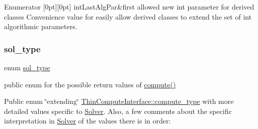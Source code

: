 \begin{DoxyEnumFields}{Enumerator}
[0pt][0pt]{}\mbox{\label{class_s_m_spp__di__unipi__it_1_1_solver_ac943b88bbfe5d261459af51eadcb5bb6a02f1c0ba6384e528e49a4076bfc21537}} 
int\+Last\+Alg\+Par&first allowed new int parameter for derived classes Convenience value for easily allow derived classes to extend the set of int algorithmic parameters. \\
\hline

\end{DoxyEnumFields}
\mbox{\label{class_s_m_spp__di__unipi__it_1_1_solver_a2e0367580e249e8e6018c919bee5481d}} 
\subsubsection{\texorpdfstring{sol\+\_\+type}{sol\_type}}
{\footnotesize\ttfamily enum \mbox{\hyperlink{class_s_m_spp__di__unipi__it_1_1_solver_a2e0367580e249e8e6018c919bee5481d}{sol\+\_\+type}}}



public enum for the possible return values of \mbox{\hyperlink{class_s_m_spp__di__unipi__it_1_1_solver_a504d4e3e174c7a518cc66156a8a45ce5}{compute()}} 

Public enum \char`\"{}extending\char`\"{} \mbox{\hyperlink{class_s_m_spp__di__unipi__it_1_1_thin_compute_interface_af53bf2e56537fb2e10afe53b17ba1080}{Thin\+Compute\+Interface\+::compute\+\_\+type}} with more detailed values specific to \mbox{\hyperlink{class_s_m_spp__di__unipi__it_1_1_solver}{Solver}}. Also, a few comments about the specific interpretation in \mbox{\hyperlink{class_s_m_spp__di__unipi__it_1_1_solver}{Solver}} of the values there is in order\+:


